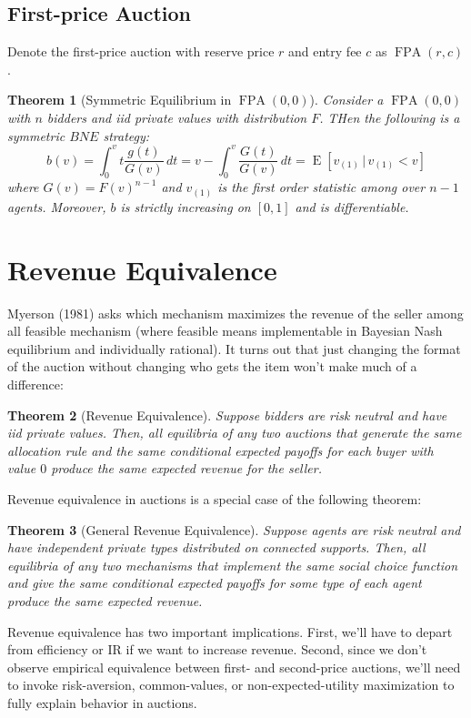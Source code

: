 \documentclass[letter, 10pt]{article}
\newtheorem{theorem}{Theorem}[section]
\theoremstyle{definition}
\DeclareMathOperator{\E}{E}
\DeclareMathOperator{\FPA}{FPA}
\begin{document}
\begin{spacing}{1.1}
\subsection{First-price Auction}

Denote the first-price auction with reserve price $r$ and
entry fee $c$ as $\FPA(r,c)$.

\begin{theorem}[Symmetric Equilibrium in $\FPA(0,0)$]
  Consider a $\FPA(0,0)$ with $n$ bidders and iid
  private values with distribution $F$. THen the
  following is a symmetric $BNE$ strategy:
  \begin{equation}
    \label{eq:1}
    b(v) = \int_0^v t \frac{g(t)}{G(v)}\,dt = v -
    \int_0^v \frac{G(t)}{G(v)}\, dt = \E[v_{(1)}\,|\,v_{(1)}<v]
  \end{equation}
  where $G(v) = F(v)^{n-1}$ and $v_{(1)}$ is the first
  order statistic among over $n-1$ agents. Moreover, $b$
  is strictly increasing on $[0,1]$ and is
  differentiable.
\end{theorem}

\section{Revenue Equivalence}

Myerson (1981) asks which mechanism maximizes the revenue of the seller
among all feasible mechanism (where feasible means implementable in
Bayesian Nash equilibrium and individually rational). It turns out that
just changing the format of the auction without changing who gets the item
won't make much of a difference:

\begin{theorem}[Revenue Equivalence]
  Suppose bidders are risk neutral and have iid private
  values. Then, all equilibria of any two auctions that generate
  the same allocation rule and the same conditional
  expected payoffs for each buyer with value $0$ produce
  the same expected revenue for the seller.
\end{theorem}
Revenue equivalence in auctions is a special case of the following theorem:
\begin{theorem}[General Revenue Equivalence]
  Suppose agents are risk neutral and have independent private types
  distributed on connected supports. Then, all equilibria of any two
  mechanisms that implement the same social choice function and give the
  same conditional expected payoffs for some type of each agent produce
  the same expected revenue.
\end{theorem}
Revenue equivalence has two important implications. First, we'll have to
depart from efficiency or IR if we want to increase revenue. Second, since
we don't observe empirical equivalence between first- and second-price
auctions, we'll need to invoke risk-aversion, common-values, or
non-expected-utility maximization to fully explain behavior in auctions.


\end{spacing}
\end{document}
